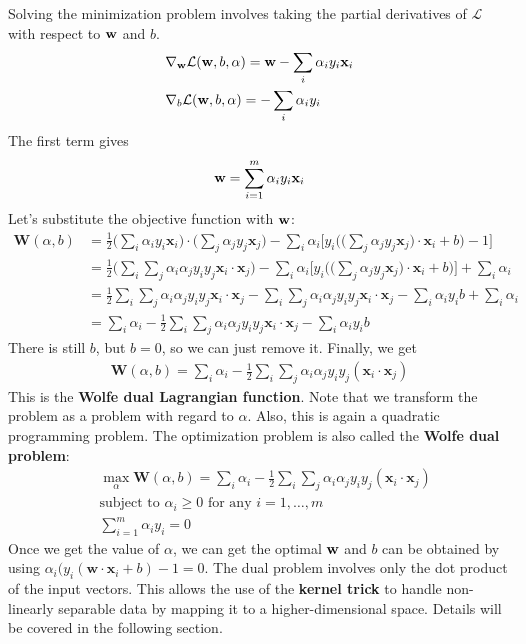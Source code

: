 Solving the minimization problem involves taking the partial derivatives of $\mathcal{L}$ with respect to ${\mathbf{w}}$ and $b$.  
\begin{align*}
	&\nabla_{\mathbf{w}}\mathcal{L}({\mathbf{w}}, b, \alpha) = {\mathbf{w}} - \sum_i \alpha_i y_i \mathbf{x}_i\\
	& \nabla_b\mathcal{L}({\mathbf{w}}, b, \alpha) = -\sum_i \alpha_i y_i
\end{align*}
The first term gives
\begin{align*}
	&{\mathbf{w}} = \sum_{i=1}^m \alpha_i y_i \mathbf{x}_i\\
\end{align*}
Let's substitute the objective function  with ${\mathbf{w}}$:
\begin{align*}
	\mathbf{W}(\alpha, b) &= \frac{1}{2}\Big(\sum_i \alpha_i y_i \mathbf{x}_i\Big)\cdot \Big(\sum_j \alpha_j y_j \mathbf{x}_j\Big) - \sum_i \alpha_i \Bigg[y_i\Bigg(\Big(\sum_j \alpha_j y_j \mathbf{x}_j\Big)\cdot \mathbf{x}_i+b\Bigg)-1\Bigg]\\
						  &= \frac{1}{2}\Big(\sum_i\sum_j \alpha_i\alpha_j y_iy_j \mathbf{x}_i\cdot \mathbf{x}_j\Big) - \sum_i \alpha_i \Bigg[y_i\Bigg(\Big(\sum_j \alpha_j y_j \mathbf{x}_j\Big)\cdot \mathbf{x}_i+b\Bigg)\Bigg]+\sum_i \alpha_i \\
						  &= \frac{1}{2}\sum_i\sum_j \alpha_i\alpha_j y_iy_j \mathbf{x}_i\cdot \mathbf{x}_j - \sum_i\sum_j \alpha_i\alpha_j y_iy_j \mathbf{x}_i \cdot \mathbf{x}_j-\sum_i \alpha_i y_i b+\sum_i \alpha_i \\
						  &= \sum_i \alpha_i -\frac{1}{2}\sum_i\sum_j \alpha_i\alpha_j y_iy_j \mathbf{x}_i\cdot \mathbf{x}_j-\sum_i \alpha_i y_i b
\end{align*}
There is still $b$, but $b=0$, so we can just remove it. Finally, we get
\begin{align}
	 \mathbf{W}(\alpha, b) = \sum_i \alpha_i -\frac{1}{2}\sum_i\sum_j \alpha_i\alpha_j y_iy_j (\mathbf{x}_i\cdot \mathbf{x}_j)
	 \label{eq:dual_form}
\end{align}
This is the \textbf{Wolfe dual Lagrangian function}. Note that we transform the problem as a problem with regard to $\alpha$. Also, this is again a quadratic programming problem. The optimization problem is also called the \textbf{Wolfe dual problem}: 
\begin{align*}
	 &\max_\alpha \mathbf{W}(\alpha, b) = \sum_i \alpha_i -\frac{1}{2}\sum_i\sum_j \alpha_i\alpha_j y_iy_j (\mathbf{x}_i\cdot \mathbf{x}_j)\\
	 &\textrm{subject to } \alpha_i\geq 0 \textrm{ for any } i=1,\dots,m\\
	 & \sum_{i=1}^m \alpha_iy_i=0
\end{align*}
Once we get the value of $\alpha$, we can get the optimal ${\mathbf{w}}$ and $b$ can be obtained by using $\alpha_i(y_i(\mathbf{w}\cdot \mathbf{x}_i+b)-1=0$. The dual problem involves only the dot product of the input vectors. This allows the use of the \textbf{kernel trick} to handle non-linearly separable data by mapping it to a higher-dimensional space. Details will be covered in the following section.


